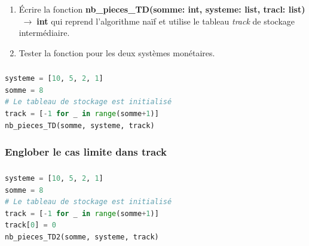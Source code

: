 \documentclass[svgnames,11pt]{beamer}
\begin{document}
\begin{frame}
    \frametitle{}

    \begin{activite}
        \begin{enumerate}
            \item Écrire la fonction \textbf{nb\_pieces\_TD(somme: int, systeme: list, tracl: list) $\;\rightarrow\;$int} qui reprend l'algorithme naïf et utilise le tableau \emph{track} de stockage intermédiaire.
            \item Tester la fonction pour les deux systèmes monétaires.
        \end{enumerate}
        \end{activite}

\end{frame}

\begin{frame}
    \frametitle{}

    

\end{frame}
\begin{frame}[fragile]
    \frametitle{}

    \begin{center}
        \begin{lstlisting}[language=Python]
systeme = [10, 5, 2, 1]
somme = 8
# Le tableau de stockage est initialisé
track = [-1 for _ in range(somme+1)]
nb_pieces_TD(somme, systeme, track)
        \end{lstlisting}
        \label{moncode}
    \end{center}

\end{frame}
\begin{frame}
    \frametitle{Englober le cas limite dans track}

    

\end{frame}

\begin{frame}[fragile]
    \frametitle{}

    \begin{center}
        \begin{lstlisting}[language=Python]
systeme = [10, 5, 2, 1]
somme = 8
# Le tableau de stockage est initialisé
track = [-1 for _ in range(somme+1)]
track[0] = 0
nb_pieces_TD2(somme, systeme, track)
        \end{lstlisting}
        \label{moncode}
    \end{center}

\end{frame}
\end{document}
